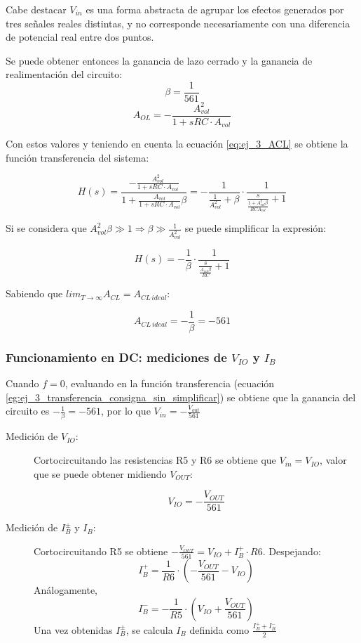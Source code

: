 \documentclass[../../main.tex]{subfiles}
\begin{document}
Cabe destacar $V_{in}$ es una forma abstracta de agrupar los efectos generados por tres se\~nales reales distintas, y no corresponde necesariamente con una diferencia de potencial real entre dos puntos.

 Se puede obtener entonces la ganancia de lazo cerrado y la ganancia de realimentaci\'on del circuito:
\[\beta = \frac{1}{561}\]
\[A_{OL} = -\frac{A_{vol}^2}{1+sRC\cdot A_{vol}}\]

Con estos valores y teniendo en cuenta la ecuaci\'on \ref{eq:ej_3_ACL} se obtiene la funci\'on transferencia del sistema:

\begin{equation}
	H(s)=\frac{-\frac{A_{vol}^2}{1+sRC\cdot A_{vol}}}{1+\frac{A_{vol}}{1+sRC\cdot A_{vol}}\beta}
	=-\frac{1}{\frac{1}{A_{vol}^2}+\beta}\cdot \frac{1}{\frac{s}{\frac{1+A_{vol}^2\beta}{RCA_{vol}}} +1}
	\label{eg:ej_3_transferencia_consigna_sin_simplificar}
\end{equation}


Si se considera que $A_{vol}^2\beta \gg 1 \Rightarrow \beta \gg \frac{1}{A_{vol}^2}$ se puede simplificar la expresi\'on:


\begin{equation}
	H(s) = -\frac{1}{\beta}\cdot \frac{1}{\frac{s}{\frac{A_{vol}\beta}{RC}}+1}
	\label{eq:ej_3_transferencia_consigna_simplificada}
\end{equation}


Sabiendo que $lim_{T\rightarrow \infty}A_{CL} = A_{CL\,ideal}$:

\begin{equation}
	A_{CL\,ideal} = -\frac{1}{\beta} = -561
\end{equation}


\subsubsection{Funcionamiento en DC: mediciones de $V_{IO}$ y $I_B$}

Cuando $f=0$, evaluando en la funci\'on transferencia (ecuaci\'on \ref{eg:ej_3_transferencia_consigna_sin_simplificar}) se obtiene que la ganancia del circuito es $-\frac{1}{\beta}=-561$, por lo que $V_{in}=-\frac{V_{out}}{561}$


\begin{description}
	\item[Medici\'on de $V_{IO}$:] Cortocircuitando las resistencias R5 y R6 se obtiene que $V_{in} = V_{IO}$, valor que se puede obtener midiendo $V_{OUT}$:
	
	\[V_{IO} = -\frac{V_{OUT}}{561}\]
	\item[Medici\'on de $I_B^\pm$ y $I_B$:] Cortocircuitando R5 se obtiene $-\frac{V_{OUT}}{561} = V_{IO} + I_B^+\cdot R6$. Despejando:
	\[I_B^+=\frac{1}{R6}\cdot\left( -\frac{V_{OUT}}{561}-V_{IO}  \right) \]
	An\'alogamente,
	\[I_B^-=-\frac{1}{R5}\cdot \left( V_{IO} + \frac{V_{OUT}}{561}   \right)\]
	Una vez obtenidas $I_B^\pm$, se calcula $I_B$ definida como $\frac{I_B^++I_B^-}{2}$
\end{description}
\end{document}
